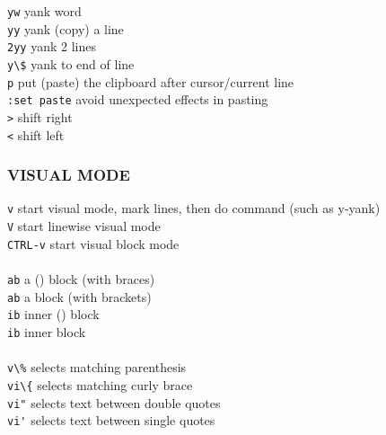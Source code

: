 \documentclass[10pt,a4paper,landscape]{article}
\begin{document}
\begin{multicols}{3}
    \colorbox{gray!20}{\lstinline{yw}}                  yank word \\
    \colorbox{gray!20}{\lstinline{yy}}                  yank (copy) a line \\
    \colorbox{gray!20}{\lstinline{2yy}}                 yank 2 lines \\
    \colorbox{gray!20}{\lstinline{y\$}}                  yank to end of line \\
    \colorbox{gray!20}{\lstinline{p}}                   put (paste) the clipboard after cursor/current line \\
    \colorbox{gray!20}{\lstinline{:set paste}}          avoid unexpected effects in pasting \\
    \colorbox{gray!20}{\lstinline{>}}                   shift right \\
    \colorbox{gray!20}{\lstinline{<}}                   shift left
    
    
    \subsubsection*{
    VISUAL MODE
    }
    
    \colorbox{gray!20}{\lstinline{v}}                   start visual mode, mark lines, then do command (such as y-yank) \\
    \colorbox{gray!20}{\lstinline{V}}                   start linewise visual mode \\
    \colorbox{gray!20}{\lstinline{CTRL-v}}              start visual block mode \\
\\
    \colorbox{gray!20}{\lstinline{ab}}                  a () block (with braces) \\
    \colorbox{gray!20}{\lstinline{ab}}                  a {} block (with brackets) \\
    \colorbox{gray!20}{\lstinline{ib}}                  inner () block \\
    \colorbox{gray!20}{\lstinline{ib}}                  inner {} block \\
\\
    \colorbox{gray!20}{\lstinline{v\%}}                  selects matching parenthesis \\
    \colorbox{gray!20}{\lstinline{vi\{}}                 selects matching curly brace \\
    \colorbox{gray!20}{\lstinline{vi"}}                 selects text between double quotes \\
    \colorbox{gray!20}{\lstinline{vi'}}                 selects text between single quotes \\
    

\end{multicols}
\end{document}
